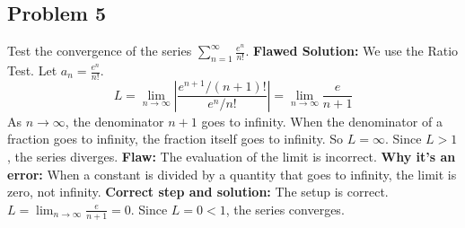 \documentclass{article}
\begin{document}
\subsection*{Problem 5}
Test the convergence of the series $\sum_{n=1}^{\infty} \frac{e^n}{n!}$.
\textbf{Flawed Solution:}
We use the Ratio Test. Let $a_n = \frac{e^n}{n!}$.
\[ L = \lim_{n \to \infty} \left| \frac{e^{n+1}/(n+1)!}{e^n/n!} \right| = \lim_{n \to \infty} \frac{e}{n+1} \]
As $n \to \infty$, the denominator $n+1$ goes to infinity. When the denominator of a fraction goes to infinity, the fraction itself goes to infinity. So $L=\infty$. Since $L > 1$, the series diverges.
\textbf{Flaw:} The evaluation of the limit is incorrect. \textbf{Why it's an error:} When a constant is divided by a quantity that goes to infinity, the limit is zero, not infinity. \textbf{Correct step and solution:} The setup is correct. $L = \lim_{n \to \infty} \frac{e}{n+1} = 0$. Since $L=0<1$, the series converges.
\end{document}
